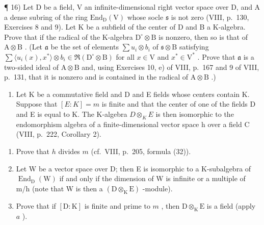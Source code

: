 ¶ 16) Let D be a field, V an infinite-dimensional right vector space over D, and A a dense subring of the ring \(\mathrm{End}_{\mathrm{D}}(\mathrm{V})\) whose socle \(\mathfrak{s}\) is not zero (VIII, p.~130, Exercises 8 and 9). Let K be a subfield of the center of D and B a K-algebra. Prove that if the radical of the K-algebra \(\mathrm{D}^{\circ} \otimes \mathrm{B}\) is nonzero, then so is that of \(\mathrm{A} \otimes \mathrm{B}\) . (Let \(\mathfrak{a}\) be the set of elements \(\sum u_{i} \otimes b_{i}\) of \(\mathfrak{s} \otimes \mathrm{B}\) satisfying \(\sum \langle u_{i}(x), x^{*} \rangle \otimes b_{i} \in \Re(\mathrm{D}^{\circ} \otimes \mathrm{B})\) for all \(x \in \mathrm{V}\) and \(x^{*} \in \mathrm{V}^{*}\) . Prove that \(\mathfrak{a}\) is a two-sided ideal of \(\mathrm{A} \otimes \mathrm{B}\) and, using Exercises 10, e) of VIII, p.~167 and 9 of VIII, p.~131, that it is nonzero and is contained in the radical of \(\mathrm{A} \otimes \mathrm{B}\) .)

\begin{enumerate}
\def\labelenumi{\arabic{enumi})}
\setcounter{enumi}{16}
\tightlist
\item
  Let K be a commutative field and D and E fields whose centers contain K. Suppose that \([E:K]=m\) is finite and that the center of one of the fields D and E is equal to K. The K-algebra \(D\otimes_{K}E\) is then isomorphic to the endomorphism algebra of a finite-dimensional vector space h over a field C (VIII, p.~222, Corollary 2).
\end{enumerate}

\begin{enumerate}
\def\labelenumi{\alph{enumi})}
\item
  Prove that \(h\) divides \(m\) (cf.~VIII, p.~205, formula (32)).
\item
  Let W be a vector space over D; then E is isomorphic to a K-subalgebra of \(\operatorname{End}_{\mathrm{D}}(\mathrm{W})\) if and only if the dimension of W is infinite or a multiple of m/h (note that W is then a \((\mathrm{D} \otimes_{\mathrm{K}} \mathrm{E})\) -module).
\item
  Prove that if \([\mathrm{D}:\mathrm{K}]\) is finite and prime to \(m\) , then \(\mathrm{D}\otimes_{\mathrm{K}}\mathrm{E}\) is a field (apply \(a\) ).
\end{enumerate}

